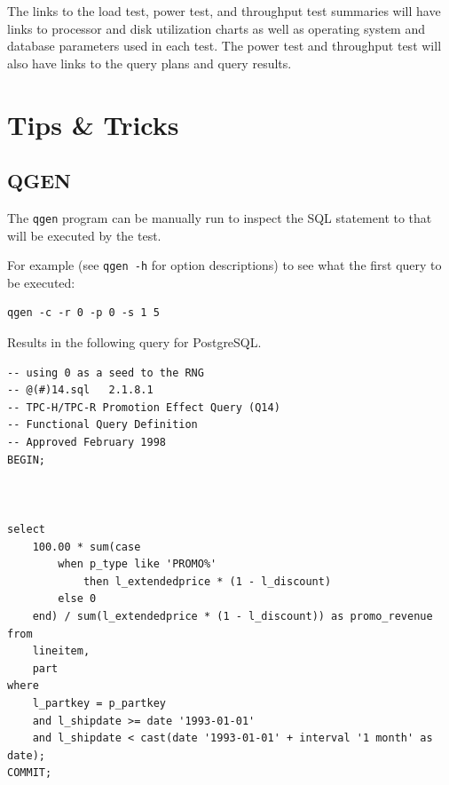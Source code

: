 \documentclass{article}
\begin{document}
The links to the load test, power test, and throughput test summaries will have links to processor and disk utilization charts as well as operating system and database parameters used in each test.  The power test and throughput test will also have links to the query plans and query results.

\section{Tips \& Tricks}

\subsection{QGEN}

The \texttt{qgen} program can be manually run to inspect the SQL statement to that will be executed by the test.

For example (see \texttt{qgen -h} for option descriptions) to see what the first query to be executed:
\lstset{language=sh}
\begin{lstlisting}
qgen -c -r 0 -p 0 -s 1 5
\end{lstlisting}

Results in the following query for PostgreSQL.
\lstset{language=sql}
\begin{lstlisting}
-- using 0 as a seed to the RNG
-- @(#)14.sql	2.1.8.1
-- TPC-H/TPC-R Promotion Effect Query (Q14)
-- Functional Query Definition
-- Approved February 1998
BEGIN;



select
	100.00 * sum(case
		when p_type like 'PROMO%'
			then l_extendedprice * (1 - l_discount)
		else 0
	end) / sum(l_extendedprice * (1 - l_discount)) as promo_revenue
from
	lineitem,
	part
where
	l_partkey = p_partkey
	and l_shipdate >= date '1993-01-01'
	and l_shipdate < cast(date '1993-01-01' + interval '1 month' as date);
COMMIT;
\end{lstlisting}
\end{document}
